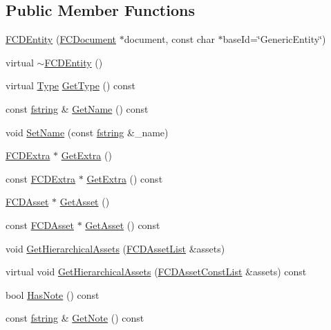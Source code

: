 \subsection*{Public Member Functions}
\begin{DoxyCompactItemize}
\item 
\hyperlink{classFCDEntity_ad302a33b87642d93072c49b385ab93a0}{FCDEntity} (\hyperlink{classFCDocument}{FCDocument} $\ast$document, const char $\ast$baseId=\char`\"{}GenericEntity\char`\"{})
\item 
virtual \hyperlink{classFCDEntity_acfd3e8347c030bcb1ee823f90037f925}{$\sim$FCDEntity} ()
\item 
virtual \hyperlink{classFCDEntity_a9301a4bd5f4d4190ec13e40db4effdd7}{Type} \hyperlink{classFCDEntity_abfd4312a7124f92364c1e6517c7e60ba}{GetType} () const 
\item 
const \hyperlink{classfm_1_1stringT}{fstring} \& \hyperlink{classFCDEntity_a35cfd66b81c3cdf9024077f36e076db3}{GetName} () const 
\item 
void \hyperlink{classFCDEntity_a1babd49b4bd5c3165932d8c390dae61e}{SetName} (const \hyperlink{classfm_1_1stringT}{fstring} \&\_\-name)
\item 
\hyperlink{classFCDExtra}{FCDExtra} $\ast$ \hyperlink{classFCDEntity_a2f05f99564ddf44896602ef020a3b5c1}{GetExtra} ()
\item 
const \hyperlink{classFCDExtra}{FCDExtra} $\ast$ \hyperlink{classFCDEntity_a9198b84815c826fed3d872c72b1c6137}{GetExtra} () const 
\item 
\hyperlink{classFCDAsset}{FCDAsset} $\ast$ \hyperlink{classFCDEntity_a73ae046205624749743904ffe23525e8}{GetAsset} ()
\item 
const \hyperlink{classFCDAsset}{FCDAsset} $\ast$ \hyperlink{classFCDEntity_a252f9f1bfbfa8fe2bcc6a447026e0ed5}{GetAsset} () const 
\item 
void \hyperlink{classFCDEntity_aacb2bd0c7d9906e6935a4cc65a0d5535}{GetHierarchicalAssets} (\hyperlink{classfm_1_1pvector}{FCDAssetList} \&assets)
\item 
virtual void \hyperlink{classFCDEntity_a8586473fa13fe14b34633342c864656a}{GetHierarchicalAssets} (\hyperlink{classfm_1_1pvector}{FCDAssetConstList} \&assets) const 
\item 
bool \hyperlink{classFCDEntity_a8026453fbf365692639dfdeda0dca56c}{HasNote} () const 
\item 
const \hyperlink{classfm_1_1stringT}{fstring} \& \hyperlink{classFCDEntity_a33412ca4c24d35ba0fe6721083c82373}{GetNote} () const 
\item 

\end{DoxyCompactItemize}
